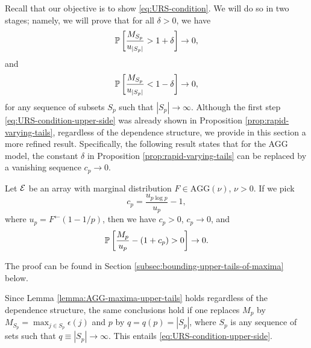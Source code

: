 
Recall that our objective is to show \eqref{eq:URS-condition}. 
We will do so in two stages; namely, we will prove that for all $\delta>0$, we have 
\begin{equation} \label{eq:URS-condition-upper-side}
    \P\left[\frac{M_{S_p}}{u_{|S_p|}} > 1+\delta\right] \to 0,
\end{equation}
and
\begin{equation} \label{eq:URS-condition-lower-side}
    \P\left[\frac{M_{S_p}}{u_{|S_p|}} < 1-\delta\right] \to 0,
\end{equation}
for any sequence of subsets $S_p$ such that $|S_p|\to\infty$.
Although the first step \eqref{eq:URS-condition-upper-side} was already shown in Proposition \ref{prop:rapid-varying-tails}, regardless of the dependence structure, we provide in this section a more refined result. 
Specifically, the following result states that for the AGG model, the constant $\delta$ in Proposition \ref{prop:rapid-varying-tails} can be replaced by a vanishing sequence $c_p\to 0$.

\begin{lemma} \label{lemma:AGG-maxima-upper-tails}
Let ${\cal E}$ be an array with marginal distribution $F\in\text{AGG}(\nu)$, $\nu>0$. If we pick
\begin{equation} \label{eq:choice-of-c_p}
    c_p = \frac{u_{p\log{p}}}{u_p} - 1,    
\end{equation} 
where $u_p = F^{\leftarrow}(1-1/p)$, then we have $c_p>0$, $c_p\to 0$, and
\begin{equation} \label{eq:AGG-max-upper-bound}
    \P\left[\frac{M_p}{u_p}-(1+c_p) > 0\right] \to 0.
\end{equation}
\end{lemma}
The proof can be found in Section \ref{subsec:bounding-upper-tails-of-maxima} below.

Since Lemma \ref{lemma:AGG-maxima-upper-tails} holds regardless of the dependence structure, the same conclusions hold if one replaces $M_p$ by $M_{S_p} = \max_{j\in S_p}\epsilon(j)$ and $p$ by $q = q(p)=|S_p|$, where $S_p$ is any sequence of sets such that $q \equiv |S_p| \to \infty$.
This entails \eqref{eq:URS-condition-upper-side}.

